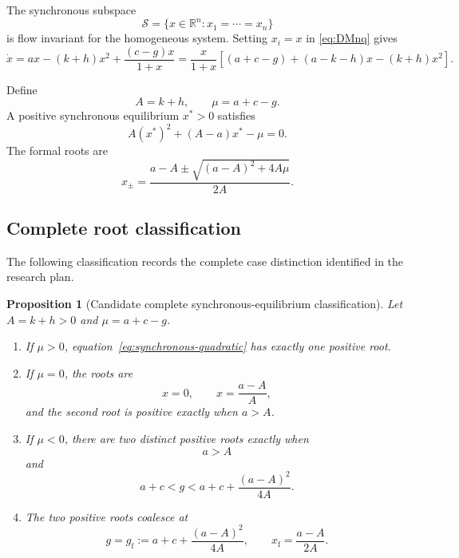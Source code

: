 \documentclass[11pt, reqno]{amsart}
\newtheorem{proposition}[theorem]{Proposition}
\theoremstyle{definition}
\theoremstyle{remark}
\newcommand{\R}{\mathbb{R}}
\begin{document}
The synchronous subspace
\[
    \mathcal S=\{x\in\R^n:x_1=\cdots=x_n\}
\]
is flow invariant for the homogeneous system.  Setting $x_i=x$ in
\eqref{eq:DMnq} gives
\begin{equation}
\label{eq:synchronous-scalar}
\dot x
=
 a x-(k+h)x^2+\frac{(c-g)x}{1+x}
=
\frac{x}{1+x}
\left[
(a+c-g)+(a-k-h)x-(k+h)x^2
\right].
\end{equation}

Define
\begin{equation}
\label{eq:A-mu}
    A=k+h,
    \qquad
    \mu=a+c-g.
\end{equation}
A positive synchronous equilibrium $x^*>0$ satisfies
\begin{equation}
\label{eq:synchronous-quadratic}
    A(x^*)^2+(A-a)x^*-\mu=0.
\end{equation}
The formal roots are
\begin{equation}
\label{eq:synchronous-roots}
    x_{\pm}
    =
    \frac{a-A\pm\sqrt{(a-A)^2+4A\mu}}{2A}.
\end{equation}

\subsection{Complete root classification}

The following classification records the complete case distinction identified
in the research plan.

\begin{proposition}[Candidate complete synchronous-equilibrium classification]
\label{prop:sync-classification}
Let $A=k+h>0$ and $\mu=a+c-g$.
\begin{enumerate}[label=(\roman*),leftmargin=2.5em]
    \item If $\mu>0$, equation~\eqref{eq:synchronous-quadratic} has exactly one
    positive root.

    \item If $\mu=0$, the roots are
    \[
        x=0,
        \qquad
        x=\frac{a-A}{A},
    \]
    and the second root is positive exactly when $a>A$.

    \item If $\mu<0$, there are two distinct positive roots exactly when
    \[
        a>A
    \]
    and
    \[
        a+c<g<
        a+c+\frac{(a-A)^2}{4A}.
    \]

    \item The two positive roots coalesce at
    \begin{equation}
    \label{eq:fold-location}
        g=g_{\mathrm f}
        :=a+c+\frac{(a-A)^2}{4A},
        \qquad
        x_{\mathrm f}=\frac{a-A}{2A}.
    \end{equation}
\end{enumerate}
\end{proposition}
\end{document}
